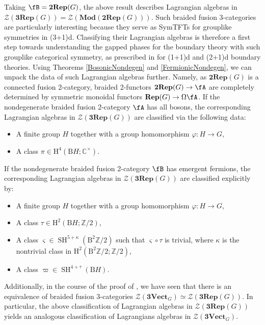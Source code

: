 \documentclass[11pt,reqno]{amsart}
\newcommand{\Z}{\mathbb{Z}}
\DeclareMathOperator{\SH}{SH}
\newcommand{\Rep}{\mathbf{Rep}}
\newcommand{\tRep}{\mathbf{2Rep}}
\newcommand{\cZ}{\mathcal{Z}}
\newcommand{\rH}{\mathrm{H}}
\newcommand{\rB}{\mathrm{B}}
\numberwithin{equation}{section}
\theoremstyle{plain}
\theoremstyle{definition}
\begin{document}
Taking $\fB = \tRep(G)$, the above result describes Lagrangian algebras in $\cZ(\mathbf{3Rep}(G)) = \mathcal{Z}(\mathbf{Mod}(\mathbf{2Rep}(G)))$. 
Such braided fusion 3-categories are particularly interesting because they serve as SymTFTs for grouplike symmetries in (3+1)d. Classifying their Lagrangian algebras is therefore a first step towards understanding the gapped phases for the boundary theory with such grouplike categorical symmetry, as prescribed in \cite{Bhardwaj:2023fca,Bhardwaj:2024qiv,Bhardwaj:2025piv} for (1+1)d and (2+1)d boundary theories. 
Using Theorems \ref{BosonicNondegen} and \ref{FermionicNondegen}, we can unpack the data of such Lagrangian algebras further.
Namely, as $\tRep(G)$ is a connected fusion 2-category, braided 2-functors $\tRep(G)\rightarrow\fA$ are completely determined by symmetric monoidal functors $\Rep(G)\rightarrow\Omega\fA$. If the nondegenerate braided fusion 2-category $\fA$ has all bosons, the corresponding Lagrangian algebras in $\cZ(\mathbf{3Rep}(G))$ are classified via the following data:
\begin{itemize}
    \item A finite group $H$ together with a group homomorphism $\varphi: H \rightarrow G$,
  \item A class $\pi\in\rH^4(\rB H; \mathbb{C}^\times)$.
\end{itemize}
If the nondegenerate braided fusion 2-category $\fB$ has emergent fermions, the corresponding Lagrangian algebras in $\cZ(\mathbf{3Rep}(G))$ are classified explicitly by:
\begin{itemize}
    \item A finite group $H$ together with a group homomorphism $\varphi: H\rightarrow G$,
    \item A class $\tau\in \rH^2(\rB H;\Z/2)$,
    \item A class $\varsigma \in \SH^{5+\kappa}(\rB^2\mathbb{Z}/2)$ such that $\varsigma\circ\tau$ is trivial, where $\kappa$ is the nontrivial class in $\rH^2(\rB^2\mathbb{Z}/2;\mathbb{Z}/2)$,
    \item A class $\varpi\in \SH^{4+\tau}(\rB H)$.
\end{itemize} 

\noindent Additionally, in the course of the proof of , we have seen that there is an equivalence of braided fusion 3-categories $\cZ(\mathbf{3Vect}_G)\simeq \cZ(\mathbf{3Rep}(G))$.
In particular, the above classification of Lagrangian algebras in $\cZ(\mathbf{3Rep}(G))$ yields an analogous classification of Lagrangians algebras in $\cZ(\mathbf{3Vect}_G)$.
\end{document}
